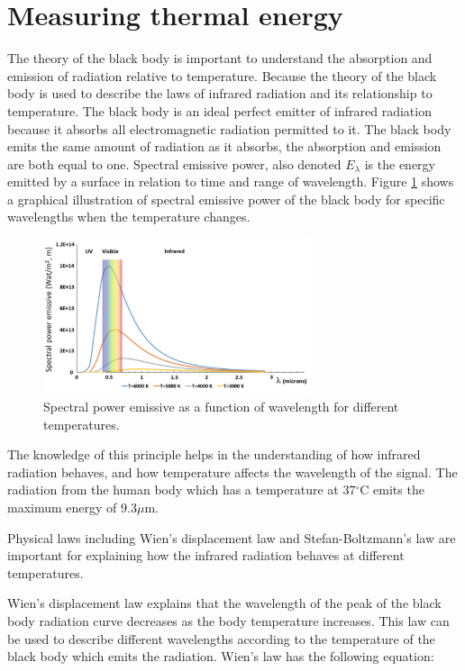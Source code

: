 \section{Measuring thermal energy}

The theory of the black body is important to understand the absorption and emission of radiation relative to temperature. Because the theory of the black body is used to describe the laws of infrared radiation and its relationship to temperature. The black body is an ideal perfect emitter of infrared radiation because it absorbs all electromagnetic radiation permitted to it. The black body emits the same amount of radiation as it absorbs, the absorption and emission are both equal to one. 
Spectral emissive power, also denoted $E_\lambda$ is the energy emitted by a surface in relation to time and range of wavelength. Figure \ref{fig:Spectral} shows a graphical illustration of spectral emissive power of the black body for specific wavelengths when the temperature changes. \cite{ignacio2017} 

\begin{figure}[H]
	\centering	\includegraphics[width=0.7\textwidth]{figures/Spectral_power_emissive}
	\caption{Spectral power emissive as a function of wavelength for different temperatures.\cite{ignacio2017}}
	\label{fig:Spectral}
\end{figure} \vspace{-.3cm}

The knowledge of this principle helps in the understanding of how infrared radiation behaves, and how temperature affects the wavelength of the signal. 
The radiation from the human body which has a temperature at 37$^{\circ}$C emits the maximum energy of $9.3 \mu$m.\cite{ignacio2017}

Physical laws including Wien's displacement law and Stefan-Boltzmann's law are important for explaining how the infrared radiation behaves at different temperatures. \cite{ignacio2017} 

Wien's displacement law explains that the wavelength of the peak of the black body radiation curve decreases as the body temperature increases. This law can be used to describe different wavelengths according to the temperature of the black body which emits the radiation. Wien's law has the following equation:\cite{ignacio2017} 

